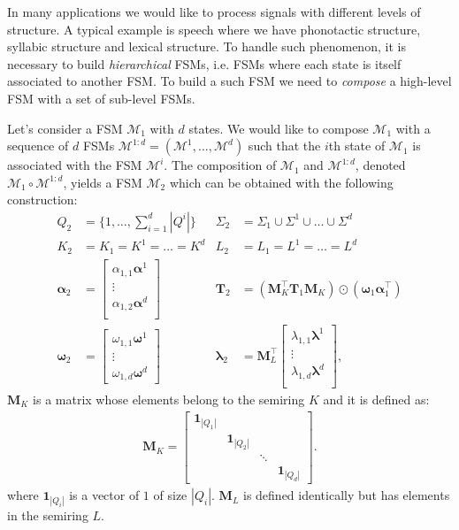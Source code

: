 In many applications we would like to process signals with different levels of
structure. A typical example is speech where we have phonotactic
structure, syllabic structure and lexical structure. To handle such
phenomenon, it is necessary to build \emph{hierarchical} FSMs, i.e.
FSMs where each state is itself associated to another FSM. To build a
such FSM we need to \emph{compose} a high-level FSM with a set of
sub-level FSMs.

Let's consider a FSM $\mathcal{M}_1$ with $d$ states. We would like to
compose $\mathcal{M}_1$ with a sequence of $d$ FSMs $\mathcal{M}^{1:d} = (\mathcal{M}^1, \dots, \mathcal{M}^d)$
such that the $i$th state of $\mathcal{M}_1$ is associated with the
FSM $\mathcal{M}^i$. The composition of $\mathcal{M}_1$ and $\mathcal{M}^{1:d}$,
denoted $\mathcal{M}_1 \circ \mathcal{M}^{1:d}$, yields a FSM $\mathcal{M}_2$
which can be obtained with the following construction:
\begin{align}
    Q_2 &= \{1, \dots, \sum_{i=1}^d |Q^i| \} & \Sigma_2 & = \Sigma_1 \cup \Sigma^1 \cup \dots \cup \Sigma^d \\
    K_2 &= K_1 = K^1 = \dots = K^d & L_2 &= L_1 = L^1 = \dots = L^d \\
    \boldsymbol{\alpha}_2 &= \begin{bmatrix}
        \alpha_{1,1} \boldsymbol{\alpha}^1 \\
        \vdots \\
        \alpha_{1,2} \boldsymbol{\alpha}^d \\
    \end{bmatrix} &
        \mathbf{T}_2 &= (\mathbf{M}_K^\top \mathbf{T}_1 \mathbf{M}_K) \odot
            (\boldsymbol{\omega}_1 \boldsymbol{\alpha}_1^\top) \\
    \boldsymbol{\omega}_2 &= \begin{bmatrix}
        \omega_{1,1} \boldsymbol{\omega}^1\\
        \vdots \\
        \omega_{1,d} \boldsymbol{\omega}^d
    \end{bmatrix} &
        \boldsymbol{\lambda}_2 &= \mathbf{M}_L^\top \begin{bmatrix}
            \lambda_{1,1} \boldsymbol{\lambda}^1 \\
            \vdots \\
            \lambda_{1,d} \boldsymbol{\lambda}^d \\
        \end{bmatrix},
\end{align}
$\mathbf{M}_K$ is a matrix whose elements belong to the semiring $K$
and it is defined as:
\begin{align}
    \mathbf{M}_K = \begin{bmatrix}
        \mathbf{1}_{|Q_1|} & & & \\
        & \mathbf{1}_{|Q_2|} & & \\
        & & \ddots & \\
        & & & \mathbf{1}_{|Q_d|}
    \end{bmatrix}.
\end{align}
where $\mathbf{1}_{|Q_i|}$ is a vector of $1$ of size $|Q_i|$. $\mathbf{M}_L$
is defined identically but has elements in the semiring $L$.


